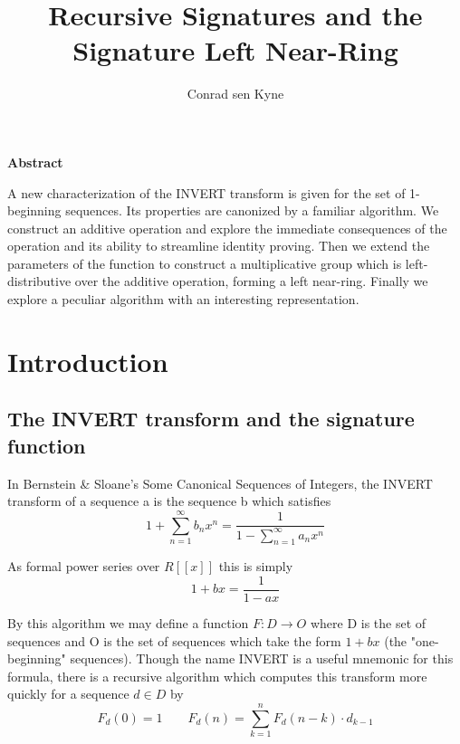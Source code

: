\documentclass{article}
\title{\Large Recursive Signatures and the Signature Left Near-Ring}
\author{Conrad sen Kyne}
\date{}
\begin{document}
\maketitle

\begin{center}
\textbf{Abstract}
\end{center}

A new characterization of the INVERT transform is given for the set of 1-beginning sequences. Its properties are canonized by a familiar algorithm. We construct an additive operation and explore the immediate consequences of the operation and its ability to streamline identity proving. Then we extend the parameters of the function to construct a multiplicative group which is left-distributive over the additive operation, forming a left near-ring. Finally we explore a peculiar algorithm with an interesting representation.

\tableofcontents

\section{Introduction}

\subsection{The INVERT transform and the signature function}

In Bernstein \& Sloane’s Some Canonical Sequences of Integers, the INVERT transform of a sequence a is the sequence b which satisfies \begin{equation}1 +  \sum_{n=1}^\infty b_n x^n = \frac{1}{1 - \displaystyle \sum_{n=1}^\infty a_n x^n}\end{equation}

\noindent As formal power series over $R[[x]]$ this is simply \begin{equation}1 + bx = \frac{1}{1 - ax}\label{invert}\end{equation}

\noindent By this algorithm we may define a function $F: D \rightarrow O$ where D is the set of sequences and O is the set of sequences which take the form $1 + bx$ (the "one-beginning" sequences). Though the name INVERT is a useful mnemonic for this formula, there is a recursive algorithm which computes this transform more quickly for a sequence $d \in D$ by \begin{equation}F_{d}(0) = 1 \qquad  F_{d}(n) = \sum_{k=1}^{n} F_{d}(n-k) \cdot d_{k-1} \end{equation}
\end{document}
